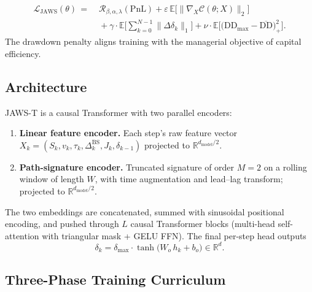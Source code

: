 \documentclass[11pt,a4paper]{article}
\begin{document}
\begin{equation}
\boxed{
\begin{aligned}
\mathcal{L}_{\mathrm{JAWS}}(\theta)
\,=\;& \mathcal{R}_{\beta,\alpha,\lambda}(\mathrm{PnL})
+ \varepsilon\, \mathbb{E}\big[\| \nabla_X \mathcal{C}(\theta;X)\|_2\big]\\
&{} + \gamma \cdot \mathbb{E}\Big[\sum_{k=0}^{N-1}\|\Delta\delta_k\|_1\Big]
+ \nu \cdot \mathbb{E}\Big[\big(\mathrm{DD}_{\max}-\overline{\mathrm{DD}}\big)_+^2\Big].
\end{aligned}}
\end{equation}
The drawdown penalty aligns training with the managerial objective of
capital efficiency.

\subsection{Architecture}

JAWS-T is a causal Transformer with two parallel encoders:
\begin{enumerate}[leftmargin=*]
  \item \textbf{Linear feature encoder.} Each step's raw feature vector
    $X_k = (S_k, v_k, \tau_k, \Delta^{\mathrm{BS}}_k, J_k, \delta_{k-1})$
    projected to $\mathbb{R}^{d_{\mathrm{model}}/2}$.
  \item \textbf{Path-signature encoder.} Truncated signature of order $M=2$
    on a rolling window of length $W$, with time augmentation and lead--lag
    transform; projected to $\mathbb{R}^{d_{\mathrm{model}}/2}$.
\end{enumerate}
The two embeddings are concatenated, summed with sinusoidal positional
encoding, and pushed through $L$ causal Transformer blocks (multi-head
self-attention with triangular mask + GELU FFN). The final per-step head
outputs
\begin{equation}
\delta_k = \delta_{\max} \cdot \tanh\big(W_o \, h_k + b_o\big) \in \mathbb{R}^d.
\end{equation}

\subsection{Three-Phase Training Curriculum}
\end{document}
